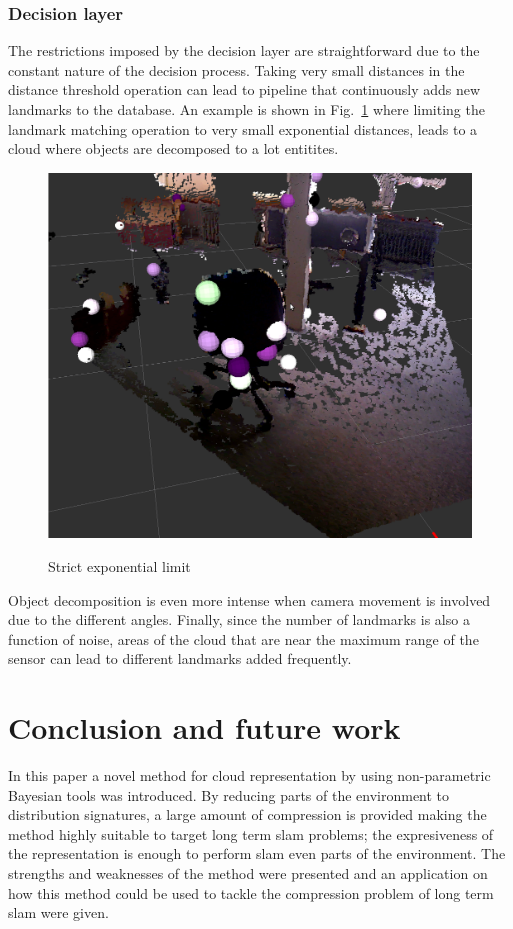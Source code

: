 \documentclass[]{article}
\begin{document}
    \subsubsection{Decision layer}

    The restrictions imposed by the decision layer are straightforward due to the constant nature of the decision process. Taking very small distances in the distance threshold operation can lead to pipeline that continuously adds new landmarks to the database. An example is shown in Fig.~\ref{pip:expo} where limiting the landmark matching operation to very small exponential distances, leads to a cloud where objects are decomposed to a lot entitites.

    \begin{figure}
        \includegraphics[width=.4\textwidth]{monsterchair} \\
        \caption{Strict exponential limit}
        \label{pip:expo}
    \end{figure}

    Object decomposition is even more intense when camera movement is involved due to the different angles. Finally, since the number of landmarks is also a function of noise, areas of the cloud that are near the maximum range of the sensor can lead to different landmarks added frequently.

    \section{Conclusion and future work}
    \label{sec:discussion}

    In this paper a novel method for cloud representation by using non-parametric Bayesian tools was introduced. By reducing parts of the environment to distribution signatures, a large amount of compression is provided making the method highly suitable to target long term slam problems; the expresiveness of the representation is enough to perform slam even parts of the environment. The strengths and weaknesses of the method were presented and an application on how this method could be used to tackle the compression problem of long term slam were given.
\end{document}

